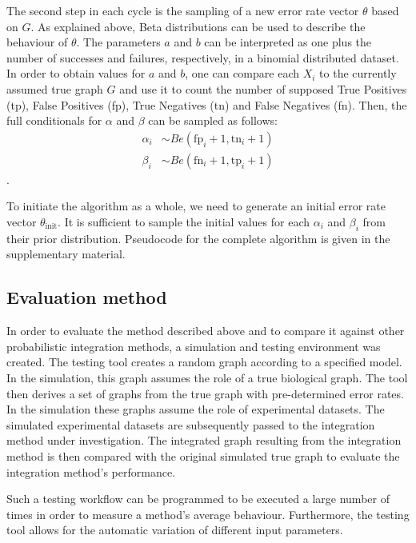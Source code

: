 \documentclass{bioinfo}
\begin{document}
\begin{methods}
The second step in each cycle is the sampling of a new error rate vector $\theta$ based on $G$. 
As explained above, Beta distributions can be used to describe the behaviour of $\theta$.
The parameters $a$ and $b$ can be interpreted as one plus the number of successes and failures, respectively, in a binomial distributed dataset. In order to obtain values for $a$ and $b$, one can compare each $X_i$ to the currently assumed true graph $G$ and use it to count the number of supposed True Positives (tp), False Positives (fp), True Negatives (tn) and False Negatives (fn). Then, the full conditionals for $\alpha$ and $\beta$ can be sampled as follows:
\begin{align}
  \alpha_i &\sim Be(\text{fp}_i+1, \text{tn}_i+1)\\
  \beta_i &\sim Be(\text{fn}_i+1, \text{tp}_i+1)
\end{align}.

To initiate the algorithm as a whole, we need to generate an initial error rate vector $\theta_{\text{init}}$. It is sufficient to sample the initial values for each $\alpha_i$ and $\beta_i$ from their prior distribution.
Pseudocode for the complete algorithm is given in the supplementary material.



\subsection{Evaluation method}

In order to evaluate the method described above and to compare it against other probabilistic integration methods, a simulation and testing environment was created. The testing tool creates a random graph according to a specified model. In the simulation, this graph assumes the role of a true biological graph. The tool then derives a set of graphs from the true graph with pre-determined error rates. In the simulation these graphs assume the role of experimental datasets. 
The simulated experimental datasets are subsequently passed to the integration method under investigation. The integrated graph resulting from the integration method is then compared with the original simulated true graph to evaluate the integration method's performance. 

Such a testing workflow can be programmed to be executed a large number of times in order to measure a method's average behaviour. Furthermore, the testing tool allows for the automatic variation of different input parameters.


\end{methods}
\end{document}
